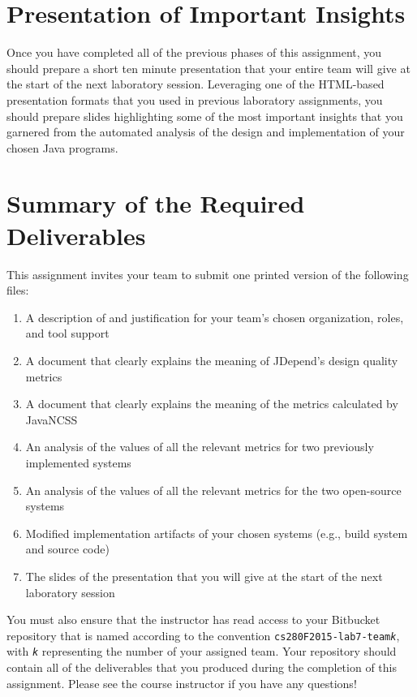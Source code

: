 \section*{Presentation of Important Insights}

Once you have completed all of the previous phases of this assignment, you should prepare a short ten minute
presentation that your entire team will give at the start of the next laboratory session. Leveraging one of the
HTML-based presentation formats that you used in previous laboratory assignments, you should prepare slides highlighting
some of the most important insights that you garnered from the automated analysis of the design and implementation of
your chosen Java programs.

\section*{Summary of the Required Deliverables}

This assignment invites your team to submit one printed version of the following files:
\vspace*{-.1in}
\begin{enumerate}
    \itemsep0em
    \item A description of and justification for your team's chosen organization, roles, and tool support
    \item A document that clearly explains the meaning of JDepend's design quality metrics
    \item A document that clearly explains the meaning of the metrics calculated by JavaNCSS
    \item An analysis of the values of all the relevant metrics for two previously implemented systems
    \item An analysis of the values of all the relevant metrics for the two open-source systems
    \item Modified implementation artifacts of your chosen systems (e.g., build system and source code)
    \item The slides of the presentation that you will give at the start of the next laboratory session
\end{enumerate}
\vspace*{-.1in}

You must also ensure that the instructor has read access to your Bitbucket repository that is named according to the
convention {\tt cs280F2015-lab7-team{\em k}}, with {\tt {\em k}} representing the number of your assigned team.  Your
repository should contain all of the deliverables that you produced during the completion of this assignment.  Please
see the course instructor if you have any questions!


